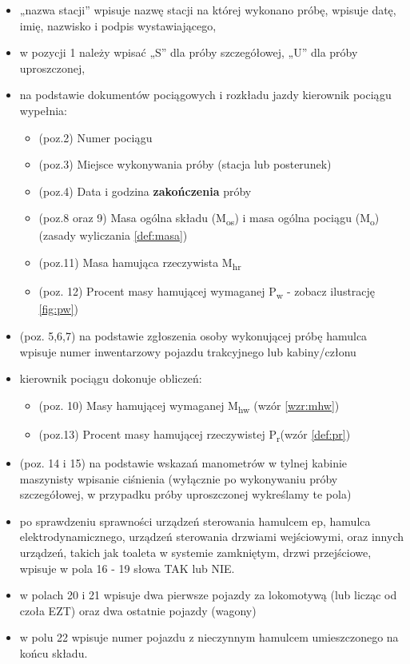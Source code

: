 \begin{itemize}
	\item „nazwa stacji” wpisuje nazwę stacji na której wykonano próbę, wpisuje datę, imię, nazwisko i podpis wystawiającego,
	\item w pozycji 1 należy wpisać „S” dla próby szczegółowej, „U” dla próby uproszczonej,
	\item na podstawie dokumentów pociągowych i rozkładu jazdy kierownik pociągu wypełnia:
	\begin{itemize}
		\item (poz.2) Numer pociągu
		\item (poz.3) Miejsce wykonywania próby (stacja lub posterunek)
		\item (poz.4) Data i godzina \textbf{zakończenia} próby
		\item (poz.8 oraz 9) Masa ogólna składu (M\textsubscript{os}) i masa ogólna pociągu (M\textsubscript{o}) (zasady wyliczania \ref{def:masa})
		\item (poz.11) Masa hamująca rzeczywista M\textsubscript{hr}
		\item (poz. 12) Procent masy hamującej wymaganej P\textsubscript{w} - zobacz ilustrację \ref{fig:pw})
	\end{itemize}
	\item (poz. 5,6,7) na podstawie zgłoszenia osoby wykonującej próbę hamulca  wpisuje numer inwentarzowy pojazdu trakcyjnego lub kabiny/członu
	\item kierownik pociągu dokonuje obliczeń:
		\begin{itemize}
			\item (poz. 10) Masy hamującej wymaganej M\textsubscript{hw} (wzór \ref{wzr:mhw})
			\item (poz.13) Procent masy hamującej rzeczywistej P\textsubscript{r}(wzór \ref{def:pr})
		\end{itemize}
	\item (poz. 14 i 15) na podstawie wskazań manometrów w tylnej kabinie maszynisty wpisanie ciśnienia (wyłącznie po wykonywaniu próby szczegółowej, w przypadku próby uproszczonej wykreślamy te pola)
	\item po sprawdzeniu sprawności urządzeń sterowania hamulcem ep, hamulca elektrodynamicznego, urządzeń sterowania drzwiami wejściowymi, oraz innych urządzeń, takich jak toaleta w systemie zamkniętym, drzwi przejściowe, wpisuje w pola 16 - 19 słowa TAK lub NIE.
	\item w polach 20 i 21 wpisuje dwa pierwsze pojazdy za lokomotywą (lub licząc od czoła EZT) oraz dwa ostatnie pojazdy (wagony)
	\item w polu 22 wpisuje numer pojazdu z nieczynnym hamulcem umieszczonego na końcu składu.	
\end{itemize}

